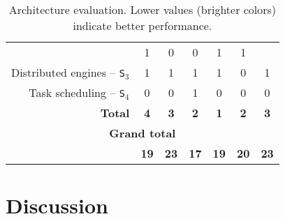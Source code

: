 \documentclass[preprint,3p,twocolumn]{elsarticle}
\begin{document}
\begin{table*}
\begin{tabular}{rcccccc}
                                     & \cellcolor[HTML]{99DD99}1
                                     & \cellcolor[HTML]{99FF99}0
                                     & \cellcolor[HTML]{99FF99}0
                                     & \cellcolor[HTML]{99DD99}1
                                     & \cellcolor[HTML]{99DD99}1 \\
Distributed engines -- \texttt{S$_3$}& \cellcolor[HTML]{99AA99}1
                                     & \cellcolor[HTML]{99AA99}1
                                     & \cellcolor[HTML]{99AA99}1
                                     & \cellcolor[HTML]{99AA99}1
                                     & \cellcolor[HTML]{99FF99}0
                                     & \cellcolor[HTML]{99AA99}1 \\
Task scheduling -- \texttt{S$_4$}    & \cellcolor[HTML]{99FF99}0
                                     & \cellcolor[HTML]{99FF99}0
                                     & \cellcolor[HTML]{99AA99}1
                                     & \cellcolor[HTML]{99FF99}0
                                     & \cellcolor[HTML]{99FF99}0
                                     & \cellcolor[HTML]{99FF99}0 \\
\textbf{Total}                       & \cellcolor[HTML]{99AA99}\textbf{4}
                                     & \cellcolor[HTML]{99BB99}\textbf{3}
                                     & \cellcolor[HTML]{99DD99}\textbf{2}
                                     & \cellcolor[HTML]{99FF99}\textbf{1}
                                     & \cellcolor[HTML]{99DD99}\textbf{2}
                                     & \cellcolor[HTML]{99BB99}\textbf{3} \\
\multicolumn{7}{c}{\cellcolor[HTML]{EEEEEE}\textbf{Grand total}}\\
                                     & \cellcolor[HTML]{99CC99}\textbf{19}
                                     & \cellcolor[HTML]{99BB99}\textbf{23}
                                     & \cellcolor[HTML]{99FF99}\textbf{17}
                                     & \cellcolor[HTML]{99CC99}\textbf{19}
                                     & \cellcolor[HTML]{99DD99}\textbf{20}
                                     & \cellcolor[HTML]{99AA99}\textbf{23}
\end{tabular}
\caption{Architecture evaluation. Lower values (brighter colors) indicate better performance.}
\label{table:evaluation}
\end{table*}



\section{Discussion}
\end{document}
